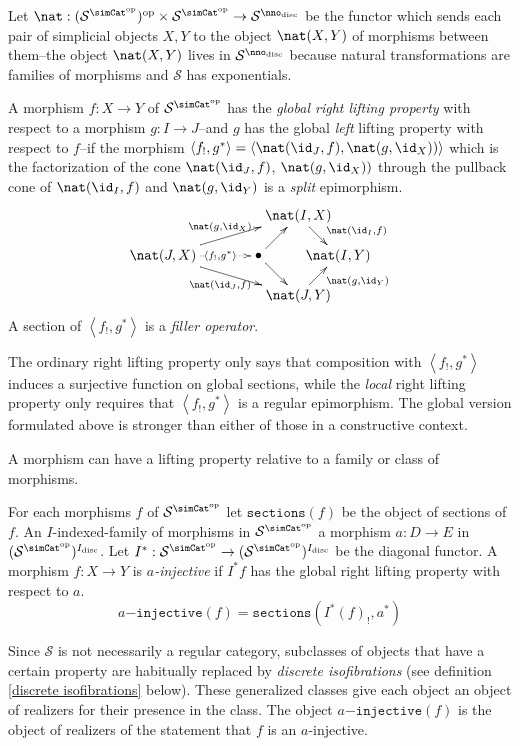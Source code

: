 \documentclass{tac}
\newcommand\cat\mathcal
\newcommand\ri{^*}
\newcommand\dual{^{\mathrm{op}}}
\newcommand\disc{_{\mathrm{disc}}}
\newcommand\s{^{\simCat\dual}}
\newcommand\bang{!}
\newcommand\of{:}
\newcommand\tuplet[1]{\left\langle #1 \right\rangle}
\newcommand\code\mathtt
\begin{document}
\begin{definition} Let $\nat\of(\cat S\s)\dual\times \cat S\s \to \cat S^{\nno\disc}$ be the functor which sends each pair of simplicial objects $X,Y$ to the object $\nat(X,Y)$ of morphisms between them--the object $\nat(X,Y)$ lives in $\cat S^{\nno\disc}$ because natural transformations are families of morphisms and $\cat S$ has exponentials.

A morphism $f\of X\to Y$ of $\cat S\s$ has the \emph{global right lifting property} with respect to a morphism $g\of I\to J$--and $g$ has the global \emph{left} lifting property with respect to $f$--if the morphism $\tuplet{f_!,g\ri} = \tuplet{\nat(\id_J,f),\nat(g,\id_X))}$ 
which is the factorization of the cone $\nat(\id_J,f)$, $\nat(g,\id_X))$ through the pullback cone of $\nat(\id_I,f)$ and $\nat(g,\id_Y)$
is a \emph{split} epimorphism.
\[\xy
(34,20)*+{\nat(I,X)}="top",(0,10)*+{\nat(J,X)}="left",(24,10)*+{\bullet}="middle",(44,10)*+{\nat(I,Y)}="right",(34,0)*+{\nat(J,Y)}="bottom"
\ar^{\nat(g,\id_X)} "left";"top" \ar@{.>}|(.6){\tuplet{f_!,g\ri}} "left";"middle" \ar_{\nat(\id_J,f)} "left";"bottom" \ar "middle";"bottom"
\ar "middle";"top" \ar^(.6){\nat(\id_I,f)} "top";"right" \ar_(.6){\nat(g,\id_Y)} "bottom";"right"
\endxy\]
A section of $\tuplet{f_\bang,g\ri}$ is a \emph{filler operator}.\label{lifting}
\end{definition}

The ordinary right lifting property only says that composition with $\tuplet{f_\bang,g\ri}$ induces a surjective function on global sections, while the \emph{local} right lifting property only requires that $\tuplet{f_\bang,g\ri}$ is a regular epimorphism. The global version formulated above is stronger than either of those in a constructive context.

A morphism can have a lifting property relative to a family or class of morphisms.

\begin{definition}[Injective] For each morphisms $f$ of $\cat S\s$ let $\code{sections}(f)$ be the object of sections of $f$. An $I$-indexed-family of morphisms in $\cat S\s$ a morphism $a\of D\to E$ in $(\cat S\s)^{I\disc}$. Let $I\ri\of\cat S\s\to (\cat S\s)^{I\disc}$ be the diagonal functor. A morphism $f\of X\to Y$ is \emph{$a$-injective} if $I\ri f$ has the global right lifting property with respect to $a$.
\[ a\code{-injective}(f)=\code{sections}(I\ri(f)_\bang,a\ri) \]
\end{definition}

\begin{remark}
Since $\cat S$ is not necessarily a regular category, subclasses of objects that have a certain property are habitually replaced by \emph{discrete isofibrations} (see definition \ref{discrete isofibrations} below). These generalized classes give each object an object of realizers for their presence in the class. The object $a\code{-injective}(f)$ is the object of realizers of the statement that $f$ is an $a$-injective.
\end{remark}
\end{document}
